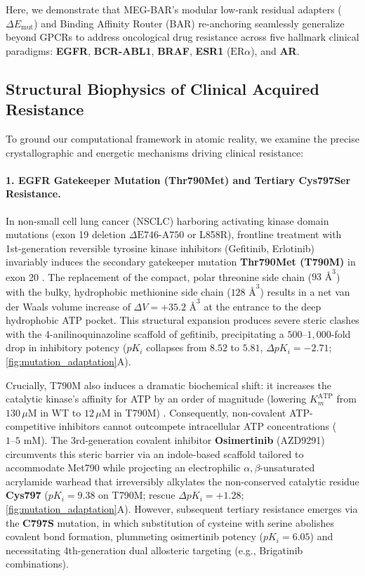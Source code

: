 \documentclass{article}
\theoremstyle{definition}
\begin{document}
Here, we demonstrate that MEG-BAR's modular low-rank residual adapters ($\Delta E_{\text{mut}}$) and Binding Affinity Router (BAR) re-anchoring seamlessly generalize beyond GPCRs to address oncological drug resistance across five hallmark clinical paradigms: \textbf{EGFR}, \textbf{BCR-ABL1}, \textbf{BRAF}, \textbf{ESR1} ($\text{ER}\alpha$), and \textbf{AR}.

\subsection{Structural Biophysics of Clinical Acquired Resistance}
\label{subsec:oncology_biophysics}

To ground our computational framework in atomic reality, we examine the precise crystallographic and energetic mechanisms driving clinical resistance:

\paragraph{1. EGFR Gatekeeper Mutation (Thr790Met) and Tertiary Cys797Ser Resistance.}
In non-small cell lung cancer (NSCLC) harboring activating kinase domain mutations (exon 19 deletion $\Delta\text{E746-A750}$ or L858R), frontline treatment with 1st-generation reversible tyrosine kinase inhibitors (Gefitinib, Erlotinib) invariably induces the secondary gatekeeper mutation \textbf{Thr790Met (T790M)} in exon 20 \citep{pao2005acquired}. The replacement of the compact, polar threonine side chain ($93\text{ \AA}^3$) with the bulky, hydrophobic methionine side chain ($128\text{ \AA}^3$) results in a net van der Waals volume increase of $\Delta V = +35.2\text{ \AA}^3$ at the entrance to the deep hydrophobic ATP pocket. This structural expansion produces severe steric clashes with the 4-anilinoquinazoline scaffold of gefitinib, precipitating a $500\text{--}1,000$-fold drop in inhibitory potency ($pK_i$ collapses from $8.52$ to $5.81$, $\Delta pK_i = -2.71$; \cref{fig:mutation_adaptation}A). 

Crucially, T790M also induces a dramatic biochemical shift: it increases the catalytic kinase's affinity for ATP by an order of magnitude (lowering $K_m^{\text{ATP}}$ from $130\,\mu\text{M}$ in WT to $12\,\mu\text{M}$ in T790M) \citep{cross2014azd9291}. Consequently, non-covalent ATP-competitive inhibitors cannot outcompete intracellular ATP concentrations ($1\text{--}5\text{ mM}$). The 3rd-generation covalent inhibitor \textbf{Osimertinib} (AZD9291) circumvents this steric barrier via an indole-based scaffold tailored to accommodate Met790 while projecting an electrophilic $\alpha,\beta$-unsaturated acrylamide warhead that irreversibly alkylates the non-conserved catalytic residue \textbf{Cys797} ($pK_i = 9.38$ on T790M; rescue $\Delta pK_i = +1.28$; \cref{fig:mutation_adaptation}A). However, subsequent tertiary resistance emerges via the \textbf{C797S} mutation, in which substitution of cysteine with serine abolishes covalent bond formation, plummeting osimertinib potency ($pK_i = 6.05$) and necessitating 4th-generation dual allosteric targeting (e.g., Brigatinib combinations).
\end{document}
